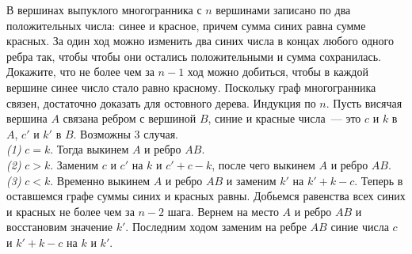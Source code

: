 \problem
В вершинах выпуклого многогранника с $n$ вершинами записано по два
положительных числа: синее и красное, причем сумма синих равна сумме красных.
За один ход можно изменить два синих числа в концах любого одного ребра так,
чтобы чтобы они остались положительными и сумма сохранилась.
Докажите, что не более чем за $n - 1$ ход можно добиться, чтобы в каждой
вершине синее число стало равно красному.
\solution
Поскольку граф многогранника связен, достаточно доказать для остовного дерева.
Индукция по $n$.
Пусть висячая вершина $A$ связана ребром с вершиной $B$,
синие и красные числа~--- это $c$ и $k$ в $A$, $c'$ и $k'$ в $B$.
Возможны 3 случая.
\\
\emph{(1)} $c = k$.
Тогда выкинем $A$ и ребро $A B$.
\\
\emph{(2)} $c > k$.
Заменим $c$ и $c'$ на $k$ и $c' + c - k$, после чего выкинем $A$ и ребро $AB$.
\\
\emph{(3)} $c < k$.
Временно выкинем $A$ и ребро $AB$ и заменим $k'$ на $k' + k - c$.
Теперь в оставшемся графе суммы синих и красных равны.
Добьемся равенства всех синих и красных не более чем за $n - 2$ шага.
Вернем на место $A$ и ребро $AB$ и восстановим значение $k'$.
Последним ходом заменим на ребре $AB$ синие числа $c$ и $k' + k - c$ на
$k$ и $k'$.
\endproblem
